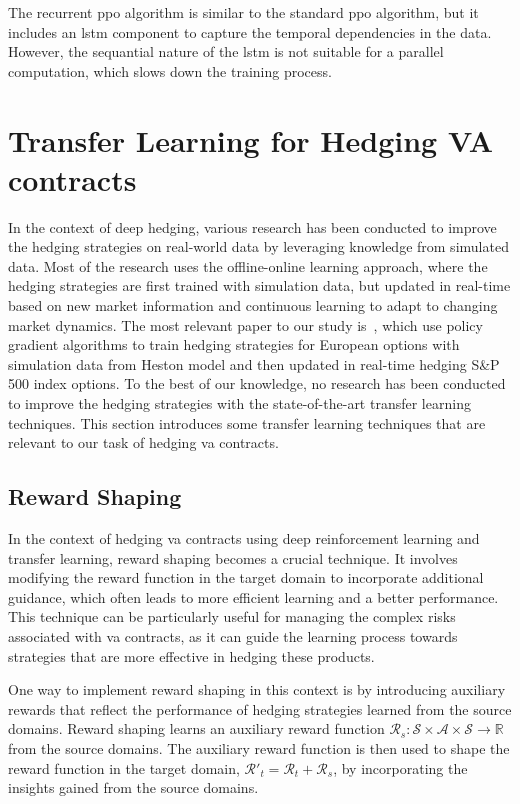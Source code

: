 The recurrent \gls{ppo} algorithm is similar to the standard \gls{ppo} algorithm, but it includes an \gls{lstm} component to capture the temporal dependencies in the data.
However, the sequantial nature of the \gls{lstm} is not suitable for a parallel computation, which slows down the training process.

\section{Transfer Learning for Hedging VA contracts} \label{sec:TransferLearning}

In the context of deep hedging, various research has been conducted to improve the hedging strategies on real-world data by leveraging knowledge from simulated data.
Most of the research uses the offline-online learning approach, where the hedging strategies are first trained with simulation data, but updated in real-time based on new market information and continuous learning to adapt to changing market dynamics.
The most relevant paper to our study is~\cite{xiao2021optimal}, which use policy gradient algorithms to train hedging strategies for European options with simulation data from Heston model and then updated in real-time hedging S\&P 500 index options.
To the best of our knowledge, no research has been conducted to improve the hedging strategies with the state-of-the-art transfer learning techniques.
This section introduces some transfer learning techniques that are relevant to our task of hedging \gls{va} contracts.

\subsection{Reward Shaping}

In the context of hedging \gls{va} contracts using deep reinforcement learning and transfer learning, reward shaping becomes a crucial technique. 
It involves modifying the reward function in the target domain to incorporate additional guidance, which often leads to more efficient learning and a better performance.
This technique can be particularly useful for managing the complex risks associated with \gls{va} contracts, as it can guide the learning process towards strategies that are more effective in hedging these products.

One way to implement reward shaping in this context is by introducing auxiliary rewards that reflect the performance of hedging strategies learned from the source domains.
Reward shaping learns an auxiliary reward function $\mathcal{R}_s: \mathcal{S} \times \mathcal{A} \times \mathcal{S} \rightarrow \mathbb{R}$ from the source domains.
The auxiliary reward function is then used to shape the reward function in the target domain, $\mathcal{R}'_t = \mathcal{R}_t + \mathcal{R}_s$, by incorporating the insights gained from the source domains.

